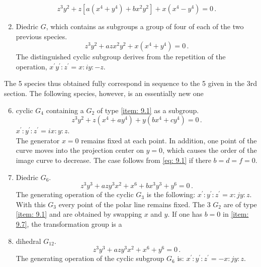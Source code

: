 \documentclass[leqno]{article}
\begin{document}
\begin{enumerate}[label=\arabic*)]
    \begin{equation}\label{eq: 9.4}
        z^3 y^2 + z[a(x^4 + y^4) + bx^2 y^2] + x(x^4 - y^4) = 0 \, . \tag{4}
    \end{equation}
    \item \label{item: 9.5}Diedric $G$, which contains as subgroups a group of four of each of the two previous species.
    \begin{equation}\label{eq: 9.5}
        z^3 y^2 + a z x^2 y^2 + x(x^4 + y^4)= 0 \, . \tag{5}
    \end{equation}
    The distinguished cyclic subgroup derives from the repetition of the operation, $x^\prime y^\prime : z^\prime = x : iy : -z$.
\end{enumerate}
The 5 species thus obtained fully correspond in sequence to the 5 given in the 3rd section. The following species, however, is an essentially new one
\begin{enumerate}[label=\arabic*)]
    \setcounter{enumi}{5}
    \item \label{item: 9.6}cyclic $G_4$ containing a $G_2$ of type \ref{item: 9.1} as a subgroup.
    \begin{equation}\label{eq: 9.6}
        z^3 y^2 + z(x^4 + a y^4) + y(bx^4 + c y^4) = 0 \, . \tag{6}
    \end{equation}
    $x^\prime : y^\prime : z^\prime = ix : y : z$. \\
    The generator $x=0$ remains fixed at each point. In addition, one point of the curve moves into the projection center on $y=0$, which causes the order of the image curve to decrease. The case follows from \eqref{eq: 9.1} if there $b=d=f=0$.
    \item \label{item: 9.7}Diedric $G_6$. 
    \begin{equation}\label{eq: 9.7}
        z^3 y^3 + a z y^3 x^2 + x^6 + b x^3 y^3 + y^6 = 0 \, . \tag{7} 
    \end{equation}
    The generating operation of the cyclic $G_3$ is the following: $x^\prime : y^\prime : z^\prime = x : jy : z$. With this $G_3$ every point of the polar line remains fixed. The 3 $G_2$ are of type \ref{item: 9.1} and are obtained by swapping $x$ and $y$. If one has $b=0$ in \ref{item: 9.7}, the transformation group is a 
    \item \label{item: 9.8}dihedral $G_{12}$. 
    \begin{equation}\label{eq: 9.8}
        z^3 y^3 + a z y^3 x^2 + x^6 + y^6 = 0 \, . \tag{8}
    \end{equation}
    The generating operation of the cyclic subgroup $G_6$ is: $x^\prime : y^\prime : z^\prime = -x : jy : z$. 
\end{enumerate}
\end{document}
